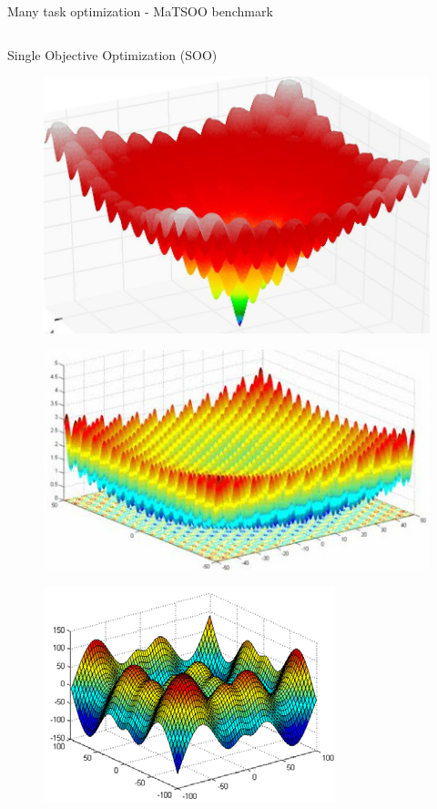 \begin{frame}{Many task optimization - MaTSOO benchmark}
\begin{columns}
\begin{column}{0.48\textwidth}
\begin{block}{Single Objective Optimization (SOO)}
\begin{figure}
                    \includegraphics[width=0.4\linewidth]{figure/intro/ackley.jpeg}
                \end{figure}
                \begin{figure}
                    \includegraphics[width=0.4\linewidth]{figure/intro/griewank.jpeg}
                \end{figure}
                \begin{figure}
                    \includegraphics[width=0.4\linewidth]{figure/intro/schwefel.png}
                \end{figure}
            \end{block}
        \end{column}
    \end{columns}
\end{frame}
